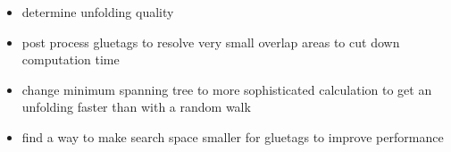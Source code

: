 \documentclass[draft,final]{vutinfth} %
\begin{document}
\begin{itemize}
	\item determine unfolding quality
	\item post process gluetags to resolve very small overlap areas to cut down computation time
	\item change minimum spanning tree to more sophisticated calculation to get an unfolding faster than with a random walk
	\item find a way to make search space smaller for gluetags to improve performance
\end{itemize}

\backmatter

\listoffigures %

\cleardoublepage %
\listoftables %

\listofalgorithms
{}

\printindex

\printglossaries



\end{document}
